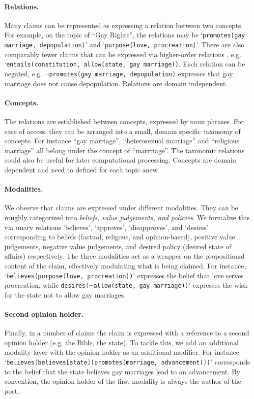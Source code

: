 \paragraph{Relations. }  Many claims can be represented as expressing a
relation between two concepts. For example, on the topic of ``Gay Rights'', 
the relations may be `\texttt{promotes(gay marriage, depopulation)}' and 
`\texttt{purpose(love, procreation)}'. 
There are also comparably fewer claims that can be expressed via
higher-order relations , e.g. `\texttt{entails(constitution, allow(state, gay marriage))}. 
Each relation can be negated, e.g. $\neg$\texttt{promotes(gay marriage,
depopulation)} expresses that gay marriage does not cause depopulation. 
Relations are domain independent. 

\paragraph{Concepts. }
The relations are established between concepts, expressed by noun phrases. 
For ease of access, they can be arranged into a small, domain specific taxonomy of concepts. 
For instance ``gay marriage'', ``heterosexual marriage'' and ``religious marriage''
all belong under the concept of ``marrriage''. 
The taxonomic relations could also be useful for later computational processing. 
Concepts are domain dependent and need to defined for each topic anew

\paragraph{Modalities. }
We observe that claims are expressed under different modalities. 
They can be roughly categorized into \textit{beliefs, value judgements, and policies}. 
We formalize this via unary relations `believes', `approves', `disapproves',
and `desires' corresponding 
to beliefs (factual, religous, and opinion-based), positive value judgements, negative value 
judgements, and desired policy (desired state of affairs) respectively. 
The three modalities act as a wrapper on the propositional content of the claim, 
effectively modulating what is being claimed. 
For instance, `\texttt{believes(purpose(love, procreation))}' expresses the belief 
that love serves procreation, while \texttt{desires(}$\neg$\texttt{allow(state, gay marriage))}'
expresses the wish for the state not to allow gay marriages. 

\paragraph{Second opinion holder. }
Finally, in a number of claims the claim is expressed with a reference to a second
opinion holder (e.g. the Bible, the state). 
To tackle this, we add an additional modality layer with the opinion holder as
an additional modifier. 
For instance `\texttt{believes(believes[state](promotes(marriage, advancement)))}' corresponds
to the belief that the state believes gay marriages lead to an advancement. 
By convention, the opinion holder of the first modality is always the author of the post. 

